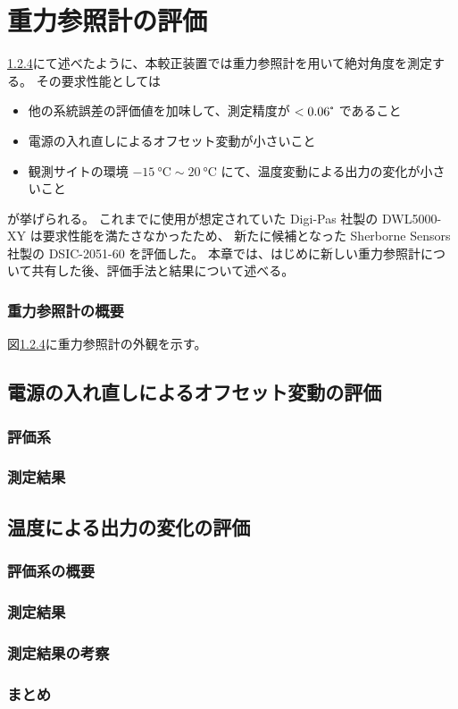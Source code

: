 \documentclass[../../main.tex]{subfiles}
\begin{document}
\chapter{重力参照計の評価}
\ref{}にて述べたように、本較正装置では重力参照計を用いて絶対角度を測定する。
その要求性能としては
\begin{itemize}
    \item 他の系統誤差の評価値を加味して、測定精度が $<0.06\tcdegree$ であること
    \item 電源の入れ直しによるオフセット変動が小さいこと
    \item 観測サイトの環境 $\SI{-15}{\degreeCelsius} \sim \SI{20}{\degreeCelsius}$ にて、温度変動による出力の変化が小さいこと
\end{itemize}
が挙げられる。
これまでに使用が想定されていた Digi-Pas 社製の DWL5000-XY は要求性能を満たさなかったため、
新たに候補となった Sherborne Sensors 社製の DSIC-2051-60 を評価した。
本章では、はじめに新しい重力参照計について共有した後、評価手法と結果について述べる。
\subsection{重力参照計の概要}
図\ref{}に重力参照計の外観を示す。
\section{電源の入れ直しによるオフセット変動の評価}
\subsection{評価系}
\subsection{測定結果}
\section{温度による出力の変化の評価}
\subsection{評価系の概要}
\subsection{測定結果}
\subsection{測定結果の考察}
\subsection{まとめ}
\end{document}
